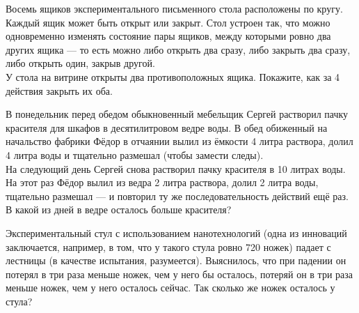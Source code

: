 ﻿
\begin{enumerate}

\itA Восемь ящиков экспериментального письменного стола расположены по кругу. Каждый ящик может быть открыт или закрыт. Стол устроен так, что можно одновременно изменять состояние пары ящиков, между которыми ровно два других ящика — то есть можно либо открыть два сразу, либо закрыть два сразу, либо открыть один, закрыв другой. \smallskip \\
У стола на витрине открыты два противоположных ящика. Покажите, как за 4 действия закрыть их оба.

\itB В понедельник перед обедом обыкновенный мебельщик Сергей растворил пачку красителя для шкафов в десятилитровом ведре воды. В обед обиженный на начальство фабрики Фёдор в отчаянии вылил из ёмкости 4 литра раствора, долил 4 литра воды и тщательно размешал (чтобы замести следы). \smallskip \\
На следующий день Сергей снова растворил пачку красителя в 10 литрах воды. На этот раз Фёдор вылил из ведра 2 литра раствора, долил 2 литра воды, тщательно размешал — и повторил ту же последовательность действий ещё раз. В какой из дней в ведре осталось больше красителя?

\itC Экспериментальный стул с использованием нанотехнологий (одна из инноваций заключается, например, в том, что у такого стула ровно 720 ножек) падает с лестницы (в качестве испытания, разумеется). Выяснилось, что при падении он потерял в три раза меньше ножек, чем у него бы осталось, потеряй он в три раза меньше ножек, чем у него осталось сейчас. Так сколько же ножек осталось у стула?
\end{enumerate}